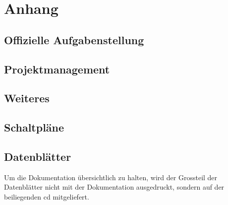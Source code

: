 %
%



\appendix
\chapter{Anhang}\label{chap.anhang}


\section{Offizielle Aufgabenstellung}\label{app.aufgabenstellung}



\section{Projektmanagement}\label{app.projektmanagement}






\section{Weiteres}\label{weiteres}


\section{Schaltpläne}\label{app.pcb}




\section{Datenblätter}\label{app.datasheets}
Um die Dokumentation übersichtlich zu halten, wird der Grossteil der Datenblätter nicht mit der Dokumentation ausgedruckt, sondern auf der beiliegenden \gls{cd} mitgeliefert.


